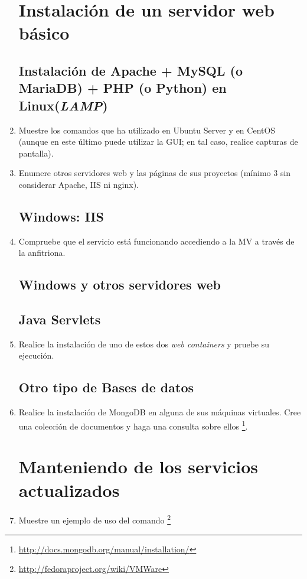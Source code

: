 \documentclass[paper=a4, fontsize=11pt]{scrartcl} %
\numberwithin{equation}{section} %
\numberwithin{figure}{section} %
\numberwithin{table}{section} %
\begin{document}
\begin{enumerate}
	\section{Instalación de un servidor web básico}
	\subsection{Instalación de Apache + MySQL (o MariaDB) + PHP (o Python) en Linux(\textit{LAMP})}
	\item Muestre los comandos que ha utilizado en Ubuntu Server y en CentOS (aunque en este último puede
	utilizar la GUI; en tal caso, realice capturas de pantalla).
	
	
	\item Enumere otros servidores web y las páginas de sus proyectos (mínimo 3 sin considerar Apache,
	IIS ni nginx).
	
	\subsection{Windows: IIS}
	\item Compruebe que el servicio está funcionando accediendo a la MV a través de la anfitriona.
	
	\subsection{Windows y otros servidores web}
	\subsection{Java Servlets}
	\item Realice la instalación de uno de estos dos \textit{web containers} y pruebe su ejecución.
	
	
	\subsection{Otro tipo de Bases de datos}
	\item Realice la instalación de MongoDB en alguna de sus máquinas virtuales. Cree una colección de
	documentos y haga una consulta sobre ellos \footnote{\url{http://docs.mongodb.org/manual/installation/}}.
	
	
	\section{Manteniendo de los servicios actualizados}
	\item Muestre un ejemplo de uso del comando \footnote{\url{http://fedoraproject.org/wiki/VMWare}}
	

\end{enumerate}
\end{document}
